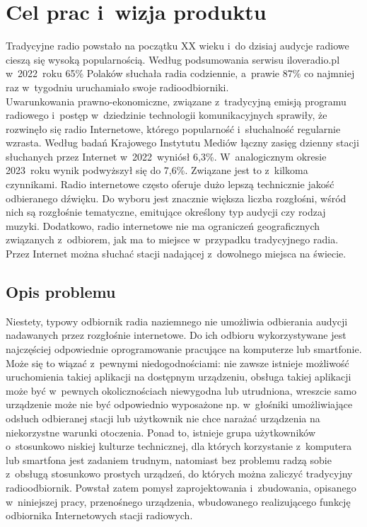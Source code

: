 \documentclass[polish]{aghengthesis}
\author{Norbert Morawski}
\date{\the\year}
\begin{document}
\lstset{inputencoding=utf8, basicstyle=\ttfamily}

\maketitle

\tableofcontents

\cleardoublepage
\chapter{Cel prac i~wizja produktu}
	Tradycyjne radio powstało na początku XX wieku i~do dzisiaj audycje radiowe cieszą się wysoką popularnością. Według podsumowania serwisu iloveradio.pl\textsuperscript{\cite{iloveradio_stats}} w~2022~roku 65\% Polaków słuchała radia codziennie, a~prawie 87\% co najmniej raz w~tygodniu uruchamiało swoje radioodbiorniki. 
	$ $\\
	
	Uwarunkowania prawno-ekonomiczne, związane z~tradycyjną emisją programu radiowego i~postęp w~dziedzinie technologii komunikacyjnych sprawiły, że rozwinęło się radio Internetowe, którego popularność i~słuchalność regularnie wzrasta. Według badań Krajowego Instytutu Mediów łączny zasięg dzienny stacji słuchanych przez Internet w~2022~wyniósł 6,3\%\textsuperscript{\cite{kim_2022}}. W~analogicznym okresie 2023~roku wynik podwyższył się do 7,6\%\textsuperscript{\cite{kim_2023}}.
	Związane jest to z~kilkoma czynnikami. Radio internetowe często oferuje dużo lepszą technicznie jakość odbieranego dźwięku. Do wyboru jest znacznie większa liczba rozgłośni, wśród nich są rozgłośnie tematyczne, emitujące określony typ audycji czy rodzaj muzyki. Dodatkowo, radio internetowe nie ma ograniczeń geograficznych związanych z~odbiorem, jak ma to miejsce w~przypadku tradycyjnego radia. Przez Internet można słuchać stacji nadającej z~dowolnego miejsca na świecie.
	
	\section{Opis problemu}
			Niestety, typowy odbiornik radia naziemnego nie umożliwia odbierania audycji nadawanych przez rozgłośnie internetowe.
			Do ich odbioru wykorzystywane jest najczęściej odpowiednie oprogramowanie pracujące na komputerze lub smartfonie.
			Może się to wiązać z~pewnymi niedogodnościami: nie zawsze istnieje możliwość uruchomienia takiej aplikacji na dostępnym urządzeniu, obsługa takiej aplikacji może być w~pewnych okolicznościach niewygodna lub utrudniona, wreszcie samo urządzenie może nie być odpowiednio wyposażone np. w~głośniki umożliwiające odsłuch odbieranej stacji lub użytkownik nie chce narażać urządzenia na niekorzystne warunki otoczenia. Ponad to, istnieje grupa użytkowników o~stosunkowo niskiej kulturze technicznej, dla których korzystanie z~komputera lub smartfona jest zadaniem trudnym, natomiast bez problemu radzą sobie z~obsługą stosunkowo prostych urządzeń, do których można zaliczyć tradycyjny radioodbiornik. Powstał zatem pomysł zaprojektowania i~zbudowania, opisanego w~niniejszej pracy, przenośnego urządzenia, wbudowanego realizującego funkcję odbiornika Internetowych stacji radiowych.
		
\end{document}
